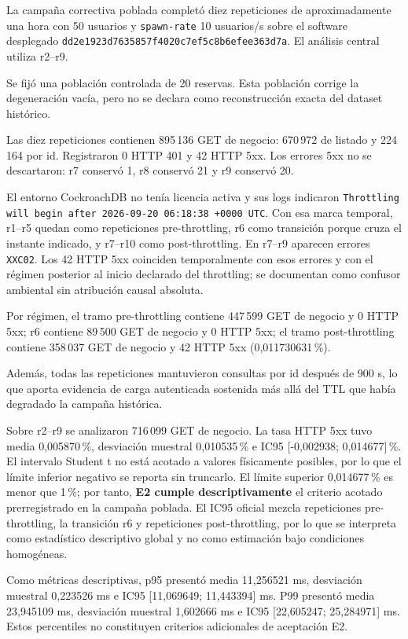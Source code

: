 La campaña correctiva poblada completó diez repeticiones de aproximadamente una
hora con 50 usuarios y \texttt{spawn-rate} 10 usuarios/s sobre el software
desplegado
\texttt{dd2e1923d7635857f4020c7ef5c8b6efee363d7a}. El análisis central
utiliza r2--r9.

Se fijó una población controlada de 20 reservas. Esta población corrige la
degeneración vacía, pero no se declara como reconstrucción exacta del dataset
histórico.

Las diez repeticiones contienen 895\,136 GET de negocio: 670\,972 de listado
y 224\,164 por id. Registraron 0 HTTP 401 y 42 HTTP 5xx. Los errores 5xx no
se descartaron: r7 conservó 1, r8 conservó 21 y r9 conservó 20.

El entorno CockroachDB no tenía licencia activa y sus logs indicaron
\texttt{Throttling will begin after 2026-09-20 06:18:38 +0000 UTC}. Con esa
marca temporal, r1--r5 quedan como repeticiones pre-throttling, r6 como
transición porque cruza el instante indicado, y r7--r10 como post-throttling.
En r7--r9 aparecen errores \texttt{XXC02}. Los 42 HTTP 5xx coinciden
temporalmente con esos errores y con el régimen posterior al inicio declarado
del throttling; se documentan como confusor ambiental sin atribución causal
absoluta.

Por régimen, el tramo pre-throttling contiene 447\,599 GET de negocio y
0 HTTP 5xx; r6 contiene 89\,500 GET de negocio y 0 HTTP 5xx; el tramo
post-throttling contiene 358\,037 GET de negocio y 42 HTTP 5xx
(0,011730631\,\%).

Además, todas las repeticiones mantuvieron consultas por id después de 900 s,
lo que aporta evidencia de carga autenticada sostenida más allá del TTL que
había degradado la campaña histórica.

Sobre r2--r9 se analizaron 716\,099 GET de negocio. La tasa HTTP 5xx tuvo media
0,005870\,\%, desviación muestral 0,010535\,\% e IC95
[-0,002938; 0,014677]\,\%. El intervalo Student t no está acotado a valores
físicamente posibles, por lo que el límite inferior negativo se reporta sin
truncarlo. El límite superior 0,014677\,\% es menor que 1\,\%; por tanto,
\textbf{E2 cumple descriptivamente} el criterio acotado prerregistrado en la
campaña poblada. El IC95 oficial mezcla repeticiones pre-throttling, la
transición r6 y repeticiones post-throttling, por lo que se interpreta como
estadístico descriptivo global y no como estimación bajo condiciones
homogéneas.

Como métricas descriptivas, p95 presentó media 11,256521 ms, desviación
muestral 0,223526 ms e IC95 [11,069649; 11,443394] ms. P99 presentó media
23,945109 ms, desviación muestral 1,602666 ms e IC95
[22,605247; 25,284971] ms. Estos percentiles no constituyen criterios
adicionales de aceptación E2.

